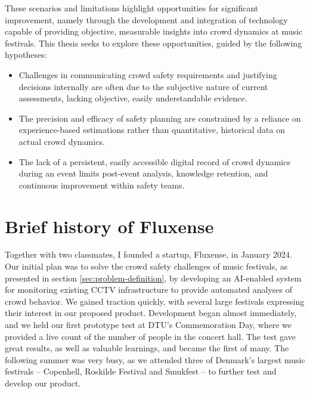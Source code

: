 These scenarios and limitations highlight opportunities for significant improvement, namely through the development and integration of technology capable of providing objective, measurable insights into crowd dynamics at music festivals. This thesis seeks to explore these opportunities, guided by the following hypotheses:

\begin{itemize}
  \item Challenges in communicating crowd safety requirements and justifying decisions internally are often due to the subjective nature of current assessments, lacking objective, easily understandable evidence.

  \item The precision and efficacy of safety planning are constrained by a reliance on experience-based estimations rather than quantitative, historical data on actual crowd dynamics.

  \item The lack of a persistent, easily accessible digital record of crowd dynamics during an event limits post-event analysis, knowledge retention, and continuous improvement within safety teams.
\end{itemize}

\section{Brief history of Fluxense}

Together with two classmates, I founded a startup, Fluxense, in January 2024. Our initial plan was to solve the crowd safety challenges of music festivals, as presented in section \ref{sec:problem-definition}, by developing an AI-enabled system for monitoring existing CCTV infrastructure to provide automated analyses of crowd behavior. We gained traction quickly, with several large festivals expressing their interest in our proposed product. Development began almost immediately, and we held our first prototype test at DTU's Commemoration Day, where we provided a live count of the number of people in the concert hall. The test gave great results, as well as valuable learnings, and became the first of many. The following summer was very busy, as we attended three of Denmark's largest music festivals -- Copenhell, Roskilde Festival and Smukfest -- to further test and develop our product.

